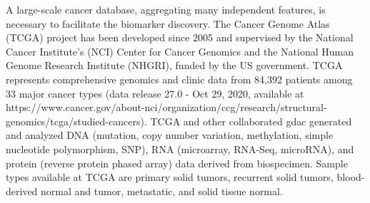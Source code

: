 \documentclass[jpm,article,submit,moreauthors,pdftex]{Definitions/mdpi}
\newenvironment{MyColorPar}[1]{%
    \leavevmode\color{#1}\ignorespaces%
}{%
}%
\begin{document}
\begin{paracol}{2}
A large-scale cancer database, aggregating many independent features, is necessary to facilitate the biomarker discovery.
The Cancer Genome Atlas (TCGA) project\cite{Weinstein2013} has been developed since 2005 and supervised by the National Cancer Institute's (NCI) Center for Cancer Genomics and the National Human Genome Research Institute (NHGRI), funded by the US government.
TCGA represents comprehensive genomics and clinic data from 84,392 patients among 33 major cancer types (data release 27.0 - Oct 29, 2020, available at https://www.cancer.gov/about-nci/organization/ccg/research/structural-genomics/tcga/studied-cancers).
TCGA and other collaborated \acrfull{gdac} generated and analyzed DNA (mutation, copy number variation, methylation, simple nucleotide polymorphism, SNP), RNA (microarray, RNA-Seq, microRNA), and protein (reverse protein phased array) data derived from biospecimen. Sample types available at TCGA are primary solid tumors, recurrent solid tumors, blood-derived normal and tumor, metastatic, and solid tissue normal.  


\end{paracol}
\end{document}
